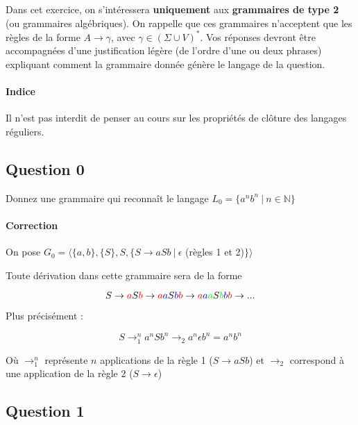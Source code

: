 \documentclass{article}[11pt]
\theoremstyle{definition}
\begin{document}
Dans cet exercice, on s'intéressera \textbf{uniquement} aux \textbf{grammaires de type 2} (ou grammaires algébriques). On rappelle que ces grammaires n'acceptent que les règles de la forme $A \rightarrow \gamma$, avec $\gamma \in (\Sigma \cup V)^*$. \newline \newline
\noindent
Vos réponses devront être accompagnées d'une justification légère (de l'ordre d'une ou deux phrases) expliquant comment la grammaire donnée génère le langage de la question.

\paragraph*{Indice} Il n'est pas interdit de penser au cours sur les propriétés de clôture des langages réguliers.

\subsection*{Question 0}

Donnez une grammaire qui reconnaît le langage $L_0 = \{a^nb^n~|~n \in \mathbb{N}\}$

\paragraph*{Correction}On pose $G_0 = \big \langle \{a,b\}, \{S\},S,\{S \rightarrow aSb~|~\epsilon $ (règles 1 et 2)$\}\big \rangle$ 


\noindent
Toute dérivation dans cette grammaire sera de la forme 

\[
S \rightarrow \textcolor{red}{a}S\textcolor{red}{b} \rightarrow \textcolor{red}{a}\textcolor{blue}{a}S\textcolor{blue}{b}\textcolor{red}{b} \rightarrow \textcolor{red}{a}\textcolor{blue}{a}\textcolor{green}{a}S\textcolor{green}{b}\textcolor{blue}{b}\textcolor{red}{b} \rightarrow ...
\]

\noindent
Plus précisément : 

\[
S \rightarrow_1^n a^nSb^n \rightarrow_2 a^n\epsilon b^n = a^nb^n
\]


\noindent
Où $\rightarrow_1^n$ représente $n$ applications de la règle 1 ($S \rightarrow aSb$) et $\rightarrow_2$ correspond à une application de la règle 2 ($S \rightarrow \epsilon$)

\subsection*{Question 1}
\end{document}
